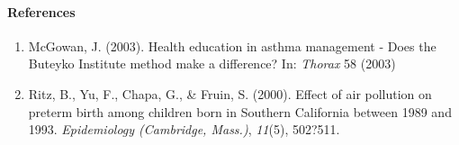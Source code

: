 \documentclass[10pt]{article}\usepackage[]{graphicx}\usepackage[]{color}
\begin{document}
\paragraph{References}

\begin{enumerate}
\item McGowan, J. (2003). Health education in asthma management - Does the Buteyko Institute method make a difference? In: {\it Thorax} 58 (2003)
\item Ritz, B., Yu, F., Chapa, G., \& Fruin, S. (2000). Effect of air pollution on preterm birth among children born in Southern California between 1989 and 1993. {\it Epidemiology (Cambridge, Mass.)}, {\it 11}(5), 502?511.
\end{enumerate}



 
\end{document}
